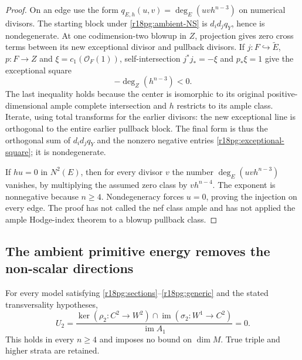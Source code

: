 \begin{proof}
On an edge use the form
$q_{E,h}(u,v)=\deg_E(uvh^{n-3})$ on numerical divisors.
The starting block under \eqref{r18pg:ambient-NS} is
$d_id_jq_Y$, hence is nondegenerate.  At one codimension-two
blowup in $Z$, projection gives zero cross terms between its
new exceptional divisor and pullback divisors.  If
$j:F\hookrightarrow\widetilde E$, $p:F\to Z$ and
$\xi=c_1(\mathcal O_F(1))$, self-intersection $j^*j_*=-\xi$
and $p_*\xi=1$ give the exceptional square
\[
                             -\deg_Z(h^{n-3})<0.
 \tag{PG18.13}\label{r18pg:exceptional-square}
\]
The last inequality holds because the center is isomorphic to its
original positive-dimensional ample complete intersection and $h$
restricts to its ample class.  Iterate, using total transforms for
the earlier divisors: the new exceptional line is orthogonal to
the entire earlier pullback block.  The final form is thus the
orthogonal sum of $d_id_jq_Y$ and the nonzero negative entries
\eqref{r18pg:exceptional-square}; it is nondegenerate.

If $hu=0$ in $N^2(E)$, then for every divisor $v$ the number
$\deg_E(uvh^{n-3})$ vanishes, by multiplying the assumed zero
class by $vh^{n-4}$.  The exponent is nonnegative because $n\ge4$.
Nondegeneracy forces $u=0$, proving the injection on every edge.
The proof has not called the nef class ample and has not applied
the ample Hodge-index theorem to a blowup pullback class.
\end{proof}

\subsection{The ambient primitive energy removes the non-scalar directions}

\begin{theorem}
\label{r18pg:U2}
For every model satisfying \eqref{r18pg:sections}--\eqref{r18pg:generic}
and the stated transversality hypotheses,
\[
       U_2=
       \frac{\ker(\rho_2:C^2\to W^2)\cap
                         \operatorname{im}(\sigma_2:W^1\to C^2)}
                     {\operatorname{im}A_1}=0.
 \tag{PG18.14}\label{r18pg:U2zero}
\]
This holds in every $n\ge4$ and imposes no bound on $\dim M$.
True triple and higher strata are retained.
\end{theorem}

